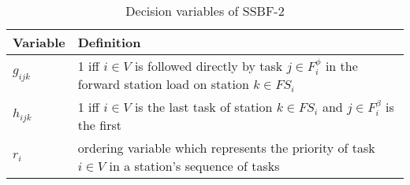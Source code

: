 \begin{table}[tbp]
	\def\arraystretch{1.1}
	\centering
	\caption{Decision variables of SSBF-2}
	\vspace{2mm}
	\begin{tabular}{lp{}}
		\toprule
		Variable & Definition \\\midrule\midrule
		$g_{ijk}$ & 1 iff $i\in V$ is followed directly by task $j \in F_i^\phi$ in the forward station load on station $k\in FS_i$ \\
		$h_{ijk}$ & 1 iff $i\in V$ is the last task of station $k\in FS_i$ and $j\in F_i^\beta$ is the first \\
		$r_i$ & ordering variable which represents the priority of task $i\in V$ in a station's sequence of tasks\\
		\bottomrule
	\end{tabular}
	\label{tab:mip:ssbfVars}
\end{table}

